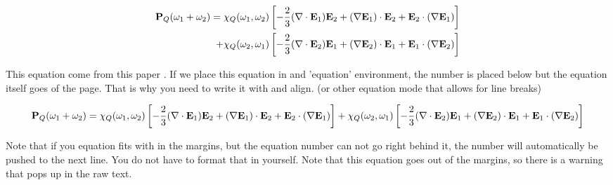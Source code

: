 \begin{align}
\bP_Q(\omega_1+\omega_2) = \chi_Q(\omega_1,\omega_2) \sqrP{-\frac{2}{3}(\nabla
\cdot \bE_1)\bE_2 + (\nabla\bE_1)\cdot\bE_2 + \bE_2\cdot(\nabla\bE_1)} \nonumber\\
+\chi_Q(\omega_2,\omega_1) \sqrP{-\frac{2}{3}(\nabla
\cdot \bE_2)\bE_1 + (\nabla\bE_2)\cdot\bE_1 + \bE_1\cdot(\nabla\bE_2)} 
\label{eqn_quad_pol_gen}
\end{align}

This equation come from this paper \cite{cite-bethune1981}. If we place this equation in and 'equation' environment, the number is placed below but the equation itself goes of the page. That is why you need to write it with and align. (or other equation mode that allows for line breaks)

\begin{equation}
{\bf P}_Q(\omega_1+\omega_2) = \chi_Q(\omega_1,\omega_2) \left[ -\frac{2}{3}(\nabla
\cdot {\bf E}_1){\bf E}_2 + (\nabla{\bf E}_1)\cdot{\bf E}_2 + {\bf E}_2\cdot(\nabla{\bf E}_1) \right]
+\chi_Q(\omega_2,\omega_1) \left[ -\frac{2}{3}(\nabla
\cdot {\bf E}_2){\bf E}_1 + (\nabla{\bf E}_2)\cdot{\bf E}_1 + {\bf E}_1\cdot(\nabla{\bf E}_2) \right] 
\end{equation}

Note that if you equation fits with in the margins, but the equation number can not go right behind it, the number will automatically be pushed to the next line. You do not have to format that in yourself. Note that this equation goes out of the margins, so there is a warning that pops up in the raw text. 